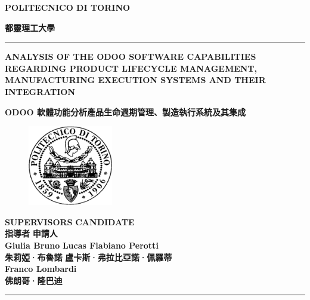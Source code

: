 \documentclass[12pt,a4paper]{report}  %
\begin{document}
\begin{center}
\vspace*{1cm}
  \fontsize{18}{16}\selectfont \textbf{POLITECNICO DI TORINO}\par
\end{center}
\begin{center}
    \fontsize{18}{16}\selectfont \textbf{都靈理工大學}\\
\end{center}
\noindent\rule{\textwidth}{0.4pt}
\vspace{0.5em}
\begin{center}
  \fontsize{12}{16}\selectfont \textbf{ANALYSIS OF THE ODOO SOFTWARE CAPABILITIES REGARDING 
PRODUCT LIFECYCLE MANAGEMENT, MANUFACTURING EXECUTION 
SYSTEMS AND THEIR INTEGRATION}\par
\end{center}
\begin{center}
   \fontsize{12}{22}\selectfont \textbf{ODOO 軟體功能分析產品生命週期管理、製造執行系統及其集成}
\end{center}
\vspace{1em}
\begin{figure}[h]
\vspace{2cm}
    \centering
    \includegraphics[width=0.33\textwidth]{logo} 
    \label{fig:logo}
\end{figure}
\vspace{2cm}
\noindent
\small\textbf{SUPERVISORS} \hfill \textbf{CANDIDATE}\\
\small\textbf{指導者} \hfill \textbf{申請人}\\
\small\textbf{Giulia Bruno } \hfill \textbf{Lucas Flabiano Perotti}\\
\small\textbf{朱莉婭·布魯諾} \hfill \textbf{盧卡斯·弗拉比亞諾·佩羅蒂}\\
\small\textbf{Franco Lombardi}\hspace{\fill} \\
\small\textbf{佛朗哥·隆巴迪}\hspace{\fill} \\
\noindent\rule{\textwidth}{0.4pt}
\end{document}
